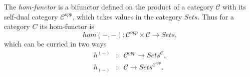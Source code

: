 \begin{frame}
\iftoggle{thmsty}{
\begin{definition}
\label{definition-hom-functor}
}{}
The {\it hom-functor} is a bifunctor defined on the product of a category $\mathcal{C}$ with its self-dual category $\mathcal{C}^{opp}$, which takes values in the category $\textit{Sets}$. Thus for a category $C$ its hom-functor is 
$$
hom(-,-): \mathcal{C}^{opp} \times \mathcal{C} \rightarrow \textit{Sets},
$$
which can be curried in two ways
\begin{eqnarray*}
h^{(-)} &:& \mathcal{C}^{opp} \rightarrow \textit{Sets}^{\mathcal{C}},\\
h_{(-)} &:& \mathcal{C} \rightarrow \textit{Sets}^{\mathcal{C}^{opp}}.
\end{eqnarray*}
\end{frame}


